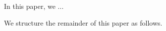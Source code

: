 \documentclass[10pt,sigconf]{acmart}
\begin{document}

In this paper, we ...





We structure the remainder of this paper as follows.

%
%
\section{}
\end{document}
